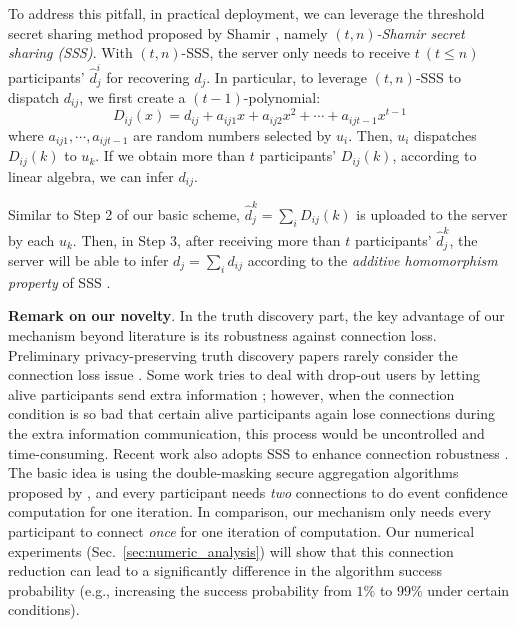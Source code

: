 \documentclass[11pt]{article}
\begin{document}
To address this pitfall, in practical deployment, we can leverage the threshold secret sharing method proposed by Shamir \cite{Leye-shamir1979share}, namely \textit{$(t,n)$-Shamir secret sharing (SSS)}. With $(t,n)$-SSS, the server only needs to receive $t\ (t\le n)$ participants' $\hat d_j^i$ for recovering $d_j$. In particular, to leverage $(t,n)$-SSS to dispatch $d_{ij}$, we first create a $(t-1)$-polynomial:
\begin{equation}
	D_{ij}(x) = d_{ij}+a_{ij1}x+a_{ij2}x^2+\cdots+a_{ijt-1}x^{t-1}
\end{equation}
where $a_{ij1},\cdots, a_{ijt-1}$ are random numbers selected by $u_i$. Then, $u_i$ dispatches $D_{ij}(k)$ to $u_k$. If we obtain more than $t$ participants' $D_{ij}(k)$, according to linear algebra, we can infer $d_{ij}$.

Similar to Step 2 of our basic scheme, $\hat d_j^k = \sum_{i} D_{ij}(k)$ is uploaded to the server by each $u_k$. Then, in Step 3, after receiving more than $t$ participants' $\hat d_j^k$, the server will be able to infer $d_j = \sum_{i} d_{ij}$ according to the \textit{additive homomorphism property} of SSS \cite{Leye-shamir1979share}.

\textbf{Remark on our novelty}. In the truth discovery part, the key advantage of our mechanism beyond literature is its robustness against connection loss. Preliminary privacy-preserving truth discovery papers rarely consider the connection loss issue \cite{Leye-Miao2017ALP}. Some work tries to deal with drop-out users by letting alive participants send extra information \cite{Leye-Zhang2021ReliableAP,Leye-Wang2021AST}; however, when the connection condition is so bad that certain alive participants again lose connections during the extra information communication, this process would be uncontrolled and time-consuming. Recent work also adopts SSS to enhance connection robustness \cite{Leye-Xu2019EfficientAP}. The basic idea is using the double-masking secure aggregation algorithms proposed by \cite{Leye-Bonawitz2017PracticalSA}, and every participant needs \textit{two} connections to do event confidence computation for one iteration. In comparison, our mechanism only needs every participant to connect \textit{once} for one iteration of computation. Our numerical experiments (Sec.~\ref{sec:numeric_analysis}) will show that this connection reduction can lead to a significantly difference in the algorithm success probability (e.g., increasing the success probability from $1\%$ to $99\%$ under certain conditions).
\end{document}
